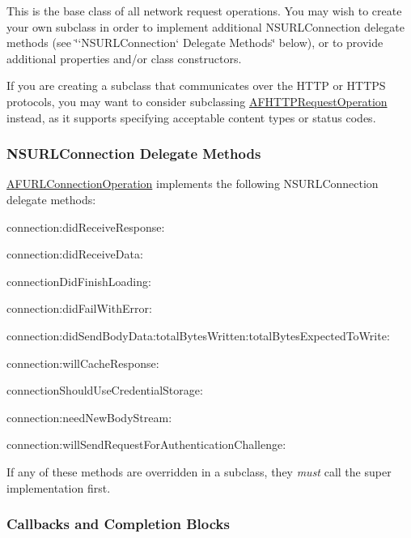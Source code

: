 This is the base class of all network request operations. You may wish to create your own subclass in order to implement additional {\ttfamily N\+S\+U\+R\+L\+Connection} delegate methods (see \char`\"{}`\+N\+S\+U\+R\+L\+Connection` Delegate Methods\char`\"{} below), or to provide additional properties and/or class constructors.

If you are creating a subclass that communicates over the H\+T\+T\+P or H\+T\+T\+P\+S protocols, you may want to consider subclassing {\ttfamily \hyperlink{interface_a_f_h_t_t_p_request_operation}{A\+F\+H\+T\+T\+P\+Request\+Operation}} instead, as it supports specifying acceptable content types or status codes.

\subsubsection*{N\+S\+U\+R\+L\+Connection Delegate Methods}

{\ttfamily \hyperlink{interface_a_f_u_r_l_connection_operation}{A\+F\+U\+R\+L\+Connection\+Operation}} implements the following {\ttfamily N\+S\+U\+R\+L\+Connection} delegate methods\+:


\begin{DoxyItemize}
\item {\ttfamily connection\+:did\+Receive\+Response\+:}
\item {\ttfamily connection\+:did\+Receive\+Data\+:}
\item {\ttfamily connection\+Did\+Finish\+Loading\+:}
\item {\ttfamily connection\+:did\+Fail\+With\+Error\+:}
\item {\ttfamily connection\+:did\+Send\+Body\+Data\+:total\+Bytes\+Written\+:total\+Bytes\+Expected\+To\+Write\+:}
\item {\ttfamily connection\+:will\+Cache\+Response\+:}
\item {\ttfamily connection\+Should\+Use\+Credential\+Storage\+:}
\item {\ttfamily connection\+:need\+New\+Body\+Stream\+:}
\item {\ttfamily connection\+:will\+Send\+Request\+For\+Authentication\+Challenge\+:}
\end{DoxyItemize}

If any of these methods are overridden in a subclass, they {\itshape must} call the {\ttfamily super} implementation first.

\subsubsection*{Callbacks and Completion Blocks}

